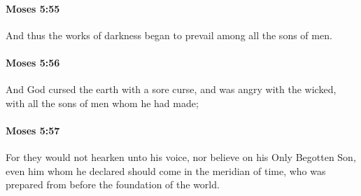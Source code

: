 		\paragraph{Moses 5:55} %
			\label{MOSES-5-55}

			And thus the works of darkness began to prevail among all the sons of men.


		\paragraph{Moses 5:56} %
			\label{MOSES-5-56}

			And God cursed the earth with a sore curse, and was angry with the wicked, with all the sons of men whom he had made;


		\paragraph{Moses 5:57} %
			\label{MOSES-5-57}

			For they would not hearken unto his voice, nor believe on his Only Begotten Son, even him whom he declared should come in the meridian of time, who was prepared from before the foundation of the world.


